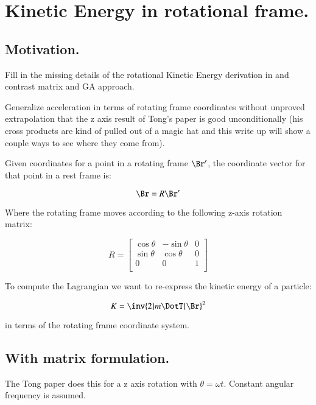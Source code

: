 \chapter{Kinetic Energy in rotational frame.}\label{chap:PJKeRot}
\date{ April 30, 2008.  Last Revision: $Date: 2009/06/04 13:13:27 $ }

\section{Motivation. }

Fill in the missing details of the rotational Kinetic Energy derivation in
\cite{TongDynamics}
and contrast matrix and GA approach.

Generalize acceleration in terms
of rotating frame coordinates without unproved extrapolation that the z axis result
of Tong's paper is good unconditionally (his cross products are kind of pulled out of
a magic hat and this write up will show a couple ways to see where they come from).

Given coordinates for a point in a rotating frame $\Br'$, the coordinate vector for that point
in a rest frame is:

\begin{equation}\label{eqn:keRot:rotcoord}
\Br = R \Br'
\end{equation}

Where the rotating frame moves according to the following z-axis rotation matrix:

\[
R = 
\begin{bmatrix}
\cos \theta & -\sin \theta & 0 \\
\sin \theta & \cos \theta & 0 \\
0 & 0 & 1 \\
\end{bmatrix}
\]

To compute the Lagrangian we want to re-express the 
kinetic energy of a particle:

\[
K = 
\inv{2} m \DotT{\Br}^2
\]

in terms of the rotating frame coordinate system.

\section{With matrix formulation. }

The Tong paper does this for a z axis rotation with $\theta = \omega t$.
Constant angular frequency is assumed.

